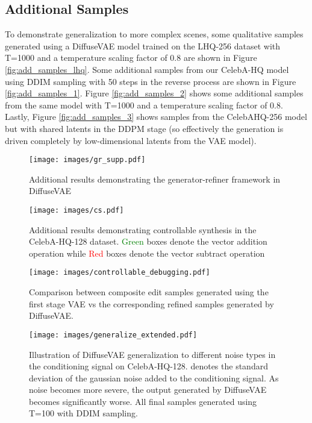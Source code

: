 \documentclass[10pt]{article} \usepackage[accepted]{tmlr}
\begin{document}
\subsection{Additional Samples}
To demonstrate generalization to more complex scenes, some qualitative samples generated using a DiffuseVAE model trained on the LHQ-256 dataset with T=1000 and a temperature scaling factor of 0.8 are shown in Figure \ref{fig:add_samples_lhq}.
Some additional samples from our CelebA-HQ model using DDIM sampling with 50 steps in the reverse process are shown in Figure \ref{fig:add_samples_1}. Figure \ref{fig:add_samples_2} shows some additional samples from the same model with T=1000 and a temperature scaling factor of 0.8. Lastly, Figure \ref{fig:add_samples_3} shows samples from the CelebAHQ-256 model but with shared latents in the DDPM stage (so effectively the generation is driven completely by low-dimensional latents from the VAE model).
\clearpage

\begin{figure*}
  \centering
    \texttt{[image: images/gr\_supp.pdf]}
    \caption{Additional results demonstrating the generator-refiner framework in DiffuseVAE}
    \label{fig:gr_add}
\end{figure*}

\begin{figure*}
  \centering
    \texttt{[image: images/cs.pdf]}
    \caption{Additional results demonstrating controllable synthesis in the CelebA-HQ-128 dataset. \textcolor{green}{Green} boxes denote the vector addition operation while \textcolor{red}{Red} boxes denote the vector subtract operation}
    \label{fig:controllable_add}
\end{figure*}

\begin{figure*}
  \centering
    \texttt{[image: images/controllable\_debugging.pdf]}
    \caption{Comparison between composite edit samples generated using the first stage VAE vs the corresponding refined samples generated by DiffuseVAE.}
    \label{fig:cs_debug}
\end{figure*}

\begin{figure*}[t]
  \centering
    \texttt{[image: images/generalize\_extended.pdf]}
    \caption{Illustration of DiffuseVAE generalization to different noise types in the conditioning signal on CelebA-HQ-128.  denotes the standard deviation of the gaussian noise added to the conditioning signal. As noise becomes more severe, the output generated by DiffuseVAE becomes significantly worse. All final samples generated using T=100 with DDIM sampling.}
    \label{fig:generalize_extended}
\end{figure*}
\end{document}
